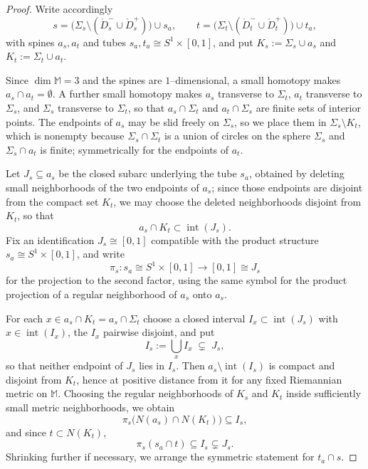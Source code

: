 \documentclass[12pt,a4paper]{amsart}
\numberwithin{equation}{section}
\newcommand{\MM}{\mathbb{M}}
\theoremstyle{plain}
\theoremstyle{definition}
\theoremstyle{remark}
\begin{document}
\begin{proof}
    Write accordingly
    \[
        s = \bigl(\Sigma_s \setminus (\mathring{D}_s^{-} \cup \mathring{D}_s^{+})\bigr) \cup s_a ,
        \qquad
        t = \bigl(\Sigma_t \setminus (\mathring{D}_t^{-} \cup \mathring{D}_t^{+})\bigr) \cup t_a ,
    \]
    with spines $a_s, a_t$ and tubes $s_a, t_a \cong S^1 \times [0,1]$, and put $K_s := \Sigma_s \cup a_s$ and $K_t := \Sigma_t \cup a_t$.

    Since $\dim \MM = 3$ and the spines are $1$--dimensional, a small homotopy makes $a_s \cap a_t = \emptyset$.
    A further small homotopy makes $a_s$ transverse to $\Sigma_t$, $a_t$ transverse to $\Sigma_s$, and $\Sigma_s$ transverse to $\Sigma_t$, so that $a_s \cap \Sigma_t$ and $a_t \cap \Sigma_s$ are finite sets of interior points.
    The endpoints of $a_s$ may be slid freely on $\Sigma_s$, so we place them in $\Sigma_s \setminus K_t$, which is nonempty because $\Sigma_s \cap \Sigma_t$ is a union of circles on the sphere $\Sigma_s$ and $\Sigma_s \cap a_t$ is finite; symmetrically for the endpoints of $a_t$.

    Let $J_s \subseteq a_s$ be the closed subarc underlying the tube $s_a$, obtained by deleting small neighborhoods of the two endpoints of $a_s$; since those endpoints are disjoint from the compact set $K_t$, we may choose the deleted neighborhoods disjoint from $K_t$, so that
    \[
        a_s \cap K_t \subset \operatorname{int}(J_s) .
    \]
    Fix an identification $J_s \cong [0,1]$ compatible with the product structure $s_a \cong S^1 \times [0,1]$, and write
    \[
        \pi_s \colon s_a \cong S^1 \times [0,1] \longrightarrow [0,1] \cong J_s
    \]
    for the projection to the second factor, using the same symbol for the product projection of a regular neighborhood of $a_s$ onto $a_s$.

    For each $x \in a_s \cap K_t = a_s \cap \Sigma_t$ choose a closed interval $I_x \subset \operatorname{int}(J_s)$ with $x \in \operatorname{int}(I_x)$, the $I_x$ pairwise disjoint, and put
    \[
        I_s := \bigcup_x I_x \;\subsetneq\; J_s ,
    \]
    so that neither endpoint of $J_s$ lies in $I_s$.
    Then $a_s \setminus \operatorname{int}(I_s)$ is compact and disjoint from $K_t$, hence at positive distance from it for any fixed Riemannian metric on $\MM$.
    Choosing the regular neighborhoods of $K_s$ and $K_t$ inside sufficiently small metric neighborhoods, we obtain
    \[
        \pi_s\bigl(N(a_s) \cap N(K_t)\bigr) \subseteq I_s ,
    \]
    and since $t \subset N(K_t)$,
    \begin{equation} \label{eq:tube_projection_control}
        \pi_s(s_a \cap t) \subseteq I_s \subsetneq J_s .
    \end{equation}
    Shrinking further if necessary, we arrange the symmetric statement for $t_a \cap s$.


\end{proof}
\end{document}
